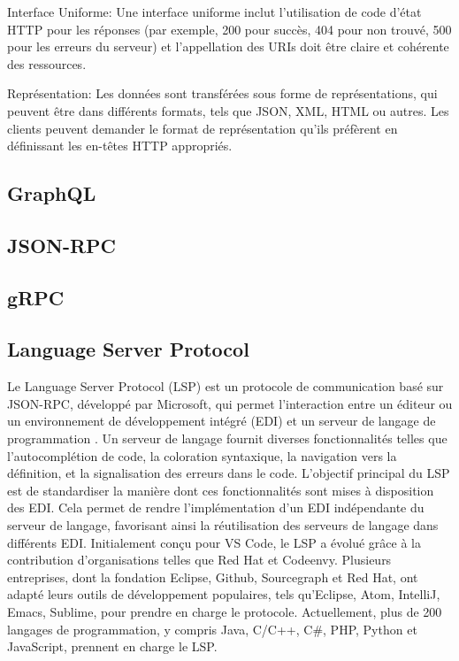 Interface Uniforme: Une interface uniforme inclut l'utilisation de code d'état HTTP pour les réponses (par exemple, 200 pour succès, 404 pour non trouvé, 500 pour les erreurs du serveur) et l'appellation des URIs doit être claire et cohérente des ressources.

Représentation: Les données sont transférées sous forme de représentations, qui peuvent être dans différents formats, tels que JSON, XML, HTML ou autres. Les clients peuvent demander le format de représentation qu'ils préfèrent en définissant les en-têtes HTTP appropriés.

\subsection{GraphQL}

\cite{Vadlamani2021}
\cite{Brito2019}
\cite{Hartina2018}
\cite{Lee2020}
\cite{Sayago2020}
\cite{guo2018design}
\subsection{JSON-RPC}

\subsection{gRPC}

\subsection{Language Server Protocol}

Le Language Server Protocol (LSP) est un protocole de communication basé sur JSON-RPC, développé par Microsoft, qui permet l'interaction entre un éditeur ou un environnement de développement intégré (EDI) et un serveur de langage de programmation \cite{Keidel2016}. Un serveur de langage fournit diverses fonctionnalités telles que l'autocomplétion de code, la coloration syntaxique, la navigation vers la définition, et la signalisation des erreurs dans le code. L'objectif principal du LSP est de standardiser la manière dont ces fonctionnalités sont mises à disposition des EDI. Cela permet de rendre l'implémentation d'un EDI indépendante du serveur de langage, favorisant ainsi la réutilisation des serveurs de langage dans différents EDI. Initialement conçu pour VS Code, le LSP a évolué grâce à la contribution d'organisations telles que Red Hat et Codeenvy. Plusieurs entreprises, dont la fondation Eclipse, Github, Sourcegraph et Red Hat, ont adapté leurs outils de développement populaires, tels qu'Eclipse, Atom, IntelliJ, Emacs, Sublime, pour prendre en charge le protocole. Actuellement, plus de 200 langages de programmation, y compris Java, C/C++, C\#, PHP, Python et JavaScript, prennent en charge le LSP.


